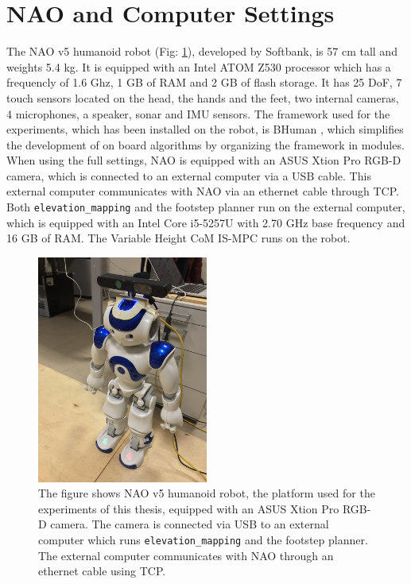 \section{NAO and Computer Settings}
The NAO v5 humanoid robot (Fig: \ref{fig:nao-with-xtion-2}), developed by 
Softbank, is 57 cm tall and weights 5.4 kg. It is equipped with an Intel ATOM 
Z530 processor which has a frequencly of 1.6 Ghz, 1 GB of RAM and 2 GB of 
flash storage. It has 25 DoF, 7 touch sensors located on the head, the hands 
and the feet, two internal cameras, 4 microphones, a speaker, sonar and IMU 
sensors. The framework used for the experiments, which has been installed on 
the robot, is BHuman \cite{BHumanCodeRelease2018}, which simplifies the 
development of on board algorithms by organizing the framework in modules.
When using the full settings, NAO is equipped with an ASUS Xtion Pro RGB-D
camera,
which is connected to an external computer via a USB cable. This external 
computer communicates with NAO via an ethernet cable through TCP.
Both \texttt{elevation\_mapping} and the footstep planner run on the external 
computer, which is equipped with an Intel Core i5-5257U with 2.70 GHz
base frequency and 16 GB of RAM. The Variable Height CoM IS-MPC runs on the 
robot. 
\begin{figure}
  \centering
  \includegraphics[width=0.5\textwidth]{figures/NAO-with-xtion-2.JPEG}
  \caption{The figure shows NAO v5 humanoid robot, the platform
      used for the experiments of this thesis, equipped with an ASUS Xtion
      Pro RGB-D camera. The camera is connected via USB to an external 
      computer which runs \texttt{elevation\_mapping} and the footstep 
      planner. The external computer communicates with NAO through an 
      ethernet cable using TCP.}
  \label{fig:nao-with-xtion-2}
\end{figure}

